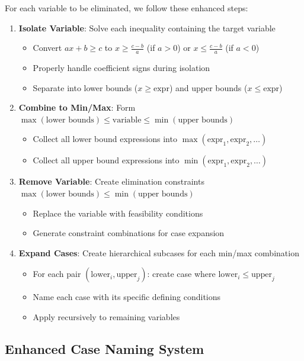 \documentclass{article}
\begin{document}
For each variable to be eliminated, we follow these enhanced steps:
\begin{enumerate}
\item \textbf{Isolate Variable}: Solve each inequality containing the target variable
  \begin{itemize}
    \item Convert $ax + b \geq c$ to $x \geq \frac{c-b}{a}$ (if $a > 0$) or $x \leq \frac{c-b}{a}$ (if $a < 0$)
    \item Properly handle coefficient signs during isolation
    \item Separate into lower bounds ($x \geq \text{expr}$) and upper bounds ($x \leq \text{expr}$)
  \end{itemize}
\item \textbf{Combine to Min/Max}: Form $\max(\text{lower bounds}) \leq \text{variable} \leq \min(\text{upper bounds})$
  \begin{itemize}
    \item Collect all lower bound expressions into $\max(\text{expr}_1, \text{expr}_2, \ldots)$
    \item Collect all upper bound expressions into $\min(\text{expr}_1, \text{expr}_2, \ldots)$
  \end{itemize}
\item \textbf{Remove Variable}: Create elimination constraints $\max(\text{lower bounds}) \leq \min(\text{upper bounds})$
  \begin{itemize}
    \item Replace the variable with feasibility conditions
    \item Generate constraint combinations for case expansion
  \end{itemize}
\item \textbf{Expand Cases}: Create hierarchical subcases for each min/max combination
  \begin{itemize}
    \item For each pair $(\text{lower}_i, \text{upper}_j)$: create case where $\text{lower}_i \leq \text{upper}_j$
    \item Name each case with its specific defining conditions
    \item Apply recursively to remaining variables
  \end{itemize}
\end{enumerate}

\subsection{Enhanced Case Naming System}
\end{document}
